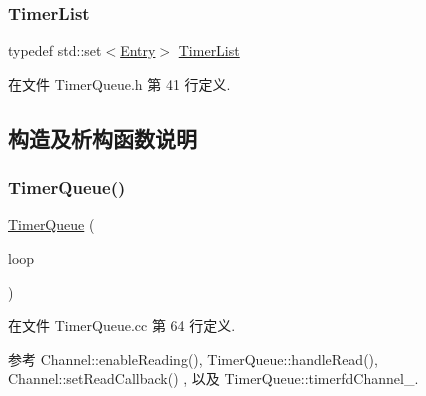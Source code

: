 \mbox{\label{classmuduo_1_1TimerQueue_aeb83ff8eddb4b17cb88a9c3dab7268a2}} 
\subsubsection{\texorpdfstring{Timer\+List}{TimerList}}
{\footnotesize\ttfamily typedef std\+::set$<$\hyperlink{classmuduo_1_1TimerQueue_aa2bab77baf38279fd11dcfcbf8fb15d8}{Entry}$>$ \hyperlink{classmuduo_1_1TimerQueue_aeb83ff8eddb4b17cb88a9c3dab7268a2}{Timer\+List}\hspace{0.3cm}{\ttfamily [private]}}



在文件 Timer\+Queue.\+h 第 41 行定义.



\subsection{构造及析构函数说明}
\mbox{\label{classmuduo_1_1TimerQueue_a7ad41aed2409f7d424fd9cf7c0c5eac8}} 
\subsubsection{\texorpdfstring{Timer\+Queue()}{TimerQueue()}}
{\footnotesize\ttfamily \hyperlink{classmuduo_1_1TimerQueue}{Timer\+Queue} (\begin{DoxyParamCaption}\item[{\hyperlink{classmuduo_1_1EventLoop}{Event\+Loop} $\ast$}]{loop }\end{DoxyParamCaption})}



在文件 Timer\+Queue.\+cc 第 64 行定义.



参考 Channel\+::enable\+Reading(), Timer\+Queue\+::handle\+Read(), Channel\+::set\+Read\+Callback() , 以及 Timer\+Queue\+::timerfd\+Channel\+\_\+.

